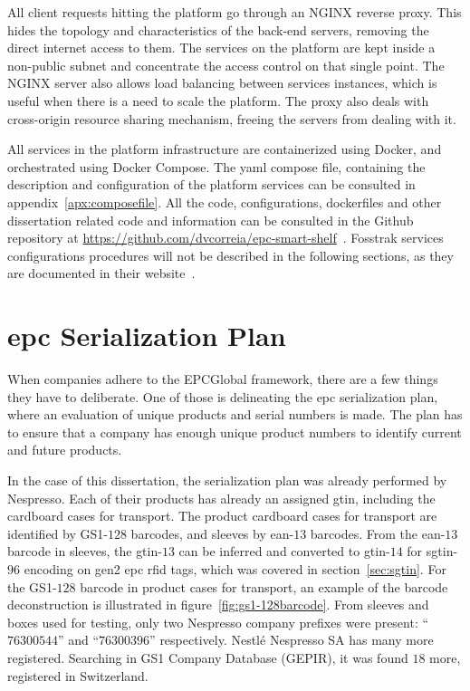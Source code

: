 All client requests hitting the platform go through an NGINX reverse proxy. This hides the topology and characteristics of the back-end servers, removing the direct internet access to them. The services on the platform are kept inside a non-public subnet and concentrate the access control on that single point. The NGINX server also allows load balancing between services instances, which is useful when there is a need to scale the platform. The proxy also deals with cross-origin resource sharing mechanism, freeing the servers from dealing with it.

All services in the platform infrastructure are containerized using Docker, and orchestrated using Docker Compose. The yaml compose file, containing the description and configuration of the platform services can be consulted in appendix~\ref{apx:composefile}.
All the code, configurations, dockerfiles and other dissertation related code and information can be consulted in the Github repository at \url{https://github.com/dvcorreia/epc-smart-shelf}~\cite{DvcorreiaEpcsmartshelve}.
Fosstrak services configurations procedures will not be described in the following sections, as they are documented in their website~\cite{FosstrakWelcome}.

\section{\acs{epc} Serialization Plan}

When companies adhere to the EPCGlobal framework, there are a few things they have to deliberate.
One of those is delineating the \acs{epc} serialization plan, where an evaluation of unique products and serial numbers is made.
The plan has to ensure that a company has enough unique product numbers to identify current and future products.

In the case of this dissertation, the serialization plan was already performed by Nespresso.
Each of their products has already an assigned \ac{gtin}, including the cardboard cases for transport.
The product cardboard cases for transport are identified by GS1-$128$ barcodes, and sleeves by \acs{ean}-$13$ barcodes.
From the \acs{ean}-$13$ barcode in sleeves, the \acs{gtin}-$13$ can be inferred and converted to \acs{gtin}-$14$ for \ac{sgtin}-$96$ encoding on \ac{gen2} \ac{epc} \acs{rfid} tags, which was covered in section~\ref{sec:sgtin}.
For the GS1-$128$ barcode in product cases for transport, an example of the barcode deconstruction is illustrated in figure~\ref{fig:gs1-128barcode}.
From sleeves and boxes used for testing, only two Nespresso company prefixes were present: ``$76300544$'' and ``$76300396$'' respectively. Nestlé Nespresso SA has many more registered. Searching in GS1 Company Database (GEPIR), it was found $18$ more, registered in Switzerland.

